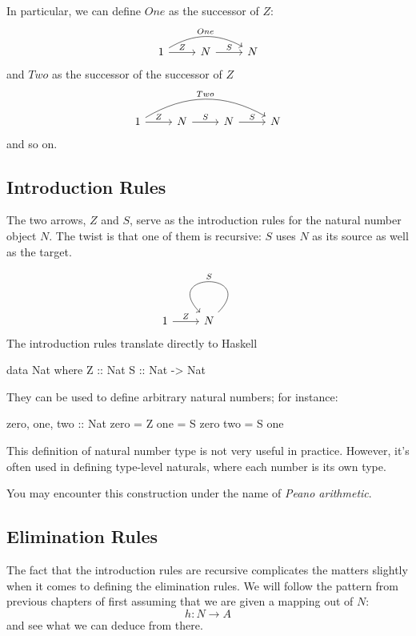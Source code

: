 \documentclass[DaoFP]{subfiles}
\begin{document}
In particular, we can define $One$ as the successor of $Z$:
\[
 \begin{tikzcd}
 1
 \arrow[rr, bend left, "One"]
 \arrow[r, "Z"]
 &N
  \arrow[r, "S"]
&N
  \end{tikzcd}
\]
and $Two$ as the successor of the successor of $Z$
\[
 \begin{tikzcd}
 1
 \arrow[rrr, bend left, "Two"]
 \arrow[r, "Z"]
 &N
  \arrow[r, "S"]
&N
  \arrow[r, "S"]
 &N
 \end{tikzcd}
\]
and so on.

\subsection{Introduction Rules}

The two arrows, $Z$ and $S$, serve as the introduction rules for the natural number object $N$. The twist is that one of them is recursive: $S$ uses $N$ as its source as well as the target.

\[
 \begin{tikzcd}
 1
 \arrow[r, "Z"]
 &N
 \arrow[loop, "S"']
 \end{tikzcd}
\]
The introduction rules translate directly to Haskell


\begin{haskell}
data Nat where
  Z :: Nat
  S :: Nat -> Nat
\end{haskell}
They can be used to define arbitrary natural numbers; for instance:

\begin{haskell}
zero, one, two :: Nat
zero = Z
one  = S zero
two  = S one
\end{haskell}

This definition of natural number type is not very useful in practice. However, it's often used in defining type-level naturals, where each number is its own type. 

You may encounter this construction under the name of \emph{Peano arithmetic}.

\subsection{Elimination Rules}

The fact that the introduction rules are recursive complicates the matters slightly when it comes to defining the elimination rules. We will follow the pattern from previous chapters of first assuming that we are given a mapping out of $N$:
\[ h \colon N \to A \]
and see what we can deduce from there. 
\end{document}

